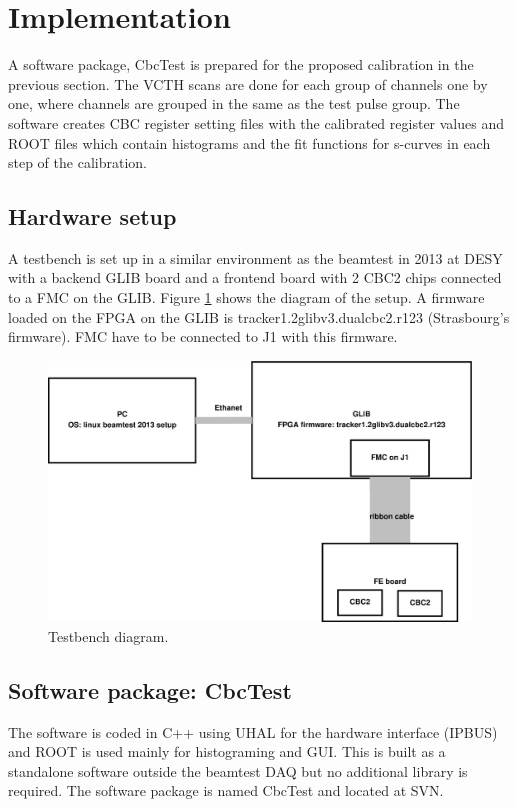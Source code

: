 \documentclass[11pt,a4paper]{article}
\begin{document}
	\section{Implementation}\label{ch:implementation}
	A software package, CbcTest is prepared for the proposed calibration in the previous section.
	The VCTH scans are done for each group of channels one by one, where channels are grouped in the same as the test pulse group.
	The software creates CBC register setting files with the calibrated register values and ROOT files which contain histograms 
	and the fit functions for s-curves in each step of the calibration.

	\subsection{Hardware setup}
	A testbench is set up in a similar environment as the beamtest in 2013 at DESY with a backend GLIB\cite{GLIB} board and a frontend board with 2 CBC2 chips connected to a FMC on the GLIB.
	Figure \ref{fig:testbench} shows the diagram of the setup.  A firmware loaded on the FPGA on the GLIB is tracker1.2glibv3.dualcbc2.r123 (Strasbourg's firmware)\cite{FIRMWARE}.  FMC have to be connected to J1 with this firmware.

	\begin{figure}[htbp]
	\centering
	\includegraphics[width=\textwidth]{fig/TestBench.eps}
	\caption{Testbench diagram. }\label{fig:testbench}
	\end{figure}

	\subsection{Software package: CbcTest}
	The software is coded in C++ using UHAL\cite{UHAL} for the hardware interface (IPBUS) and ROOT\cite{ROOT} is used mainly for histograming and GUI. 
	This is built as a standalone software outside the beamtest DAQ but no additional library is required. The software package is named CbcTest and located at SVN\cite{CBCTEST}. 
\end{document}
